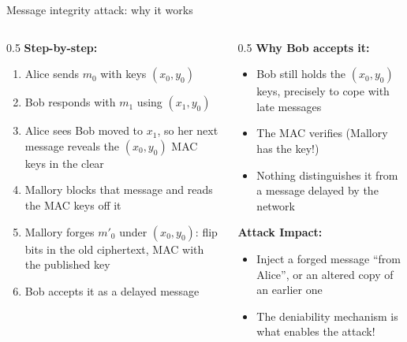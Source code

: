 \ifdefined\PRESENTATION\else\PassOptionsToClass{handout}{beamer}\fi\documentclass[aspectratio=169, lualatex]{beamer}
\begin{document}
\begin{frame}{Message integrity attack: why it works}
	\begin{columns}
		\begin{column}{0.5\textwidth}
			\textbf{Step-by-step:}
			\begin{enumerate}
				\item Alice sends $m_0$ with keys $(x_0, y_0)$
				\item Bob responds with $m_1$ using $(x_1, y_0)$
				\item Alice sees Bob moved to $x_1$, so her next message reveals the $(x_0, y_0)$ MAC keys in the clear
				\item Mallory blocks that message and reads the MAC keys off it
				\item Mallory forges $m'_0$ under $(x_0, y_0)$: flip bits in the old ciphertext, MAC with the published key
				\item Bob accepts it as a delayed message
			\end{enumerate}
		\end{column}
		\begin{column}{0.5\textwidth}
			\textbf{Why Bob accepts it:}
			\begin{itemize}
				\item Bob still holds the $(x_0, y_0)$ keys, precisely to cope with late messages
				\item The MAC verifies (Mallory has the key!)
				\item Nothing distinguishes it from a message delayed by the network
			\end{itemize}
			\textbf{Attack Impact:}
			\begin{itemize}
				\item Inject a forged message ``from Alice'', or an altered copy of an earlier one
				\item The deniability mechanism is what enables the attack!
			\end{itemize}
		\end{column}
	\end{columns}
\end{frame}
\end{document}
